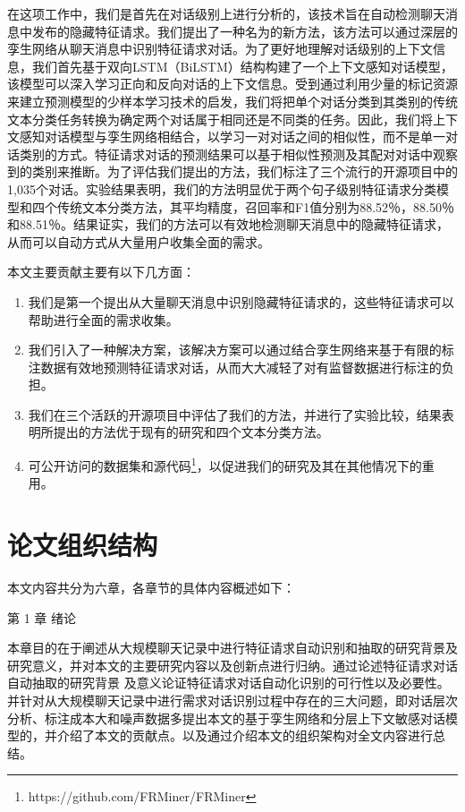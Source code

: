 在这项工作中，我们是首先在对话级别上进行分析的，该技术旨在自动检测聊天消息中发布的隐藏特征请求。我们提出了一种名为{\tool}的新方法，该方法可以通过深层的孪生网络从聊天消息中识别特征请求对话。为了更好地理解对话级别的上下文信息，我们首先基于双向LSTM（BiLSTM）结构构建了一个上下文感知对话模型，该模型可以深入学习正向和反向对话的上下文信息。受到通过利用少量的标记资源来建立预测模型的少样本学习技术的启发，我们将把单个对话分类到其类别的传统文本分类任务转换为确定两个对话属于相同还是不同类的任务。因此，我们将上下文感知对话模型与孪生网络相结合，以学习一对对话之间的相似性，而不是单一对话类别的方式。特征请求对话的预测结果可以基于相似性预测及其配对对话中观察到的类别来推断。为了评估我们提出的方法，我们标注了三个流行的开源项目中的1,035个对话。实验结果表明，我们的方法明显优于两个句子级别特征请求分类模型和四个传统文本分类方法，其平均精度，召回率和F1值分别为88.52％，88.50％和88.51％。结果证实，我们的方法可以有效地检测聊天消息中的隐藏特征请求，从而可以自动方式从大量用户收集全面的需求。

本文主要贡献主要有以下几方面：
\begin{enumerate}
    \item  我们是第一个提出从大量聊天消息中识别隐藏特征请求的，这些特征请求可以帮助进行全面的需求收集。
    \item 我们引入了一种解决方案，该解决方案可以通过结合孪生网络来基于有限的标注数据有效地预测特征请求对话，从而大大减轻了对有监督数据进行标注的负担。
    \item 我们在三个活跃的开源项目中评估了我们的方法，并进行了实验比较，结果表明所提出的方法优于现有的研究和四个文本分类方法。
    \item 可公开访问的数据集和源代码\footnote{https://github.com/FRMiner/FRMiner}，以促进我们的研究及其在其他情况下的重用。
\end{enumerate}



\section{论文组织结构}
本文内容共分为六章，各章节的具体内容概述如下： 

第 1 章 绪论 

本章目的在于阐述从大规模聊天记录中进行特征请求自动识别和抽取的研究背景及研究意义，并对本文的主要研究内容以及创新点进行归纳。通过论述特征请求对话自动抽取的研究背景
及意义论证特征请求对话自动化识别的可行性以及必要性。并针对从大规模聊天记录中进行需求对话识别过程中存在的三大问题，即对话层次分析、标注成本大和噪声数据多提出本文的基于孪生网络和分层上下文敏感对话模型的{\tool}，并介绍了本文的贡献点。以及通过介绍本文的组织架构对全文内容进行总结。 

